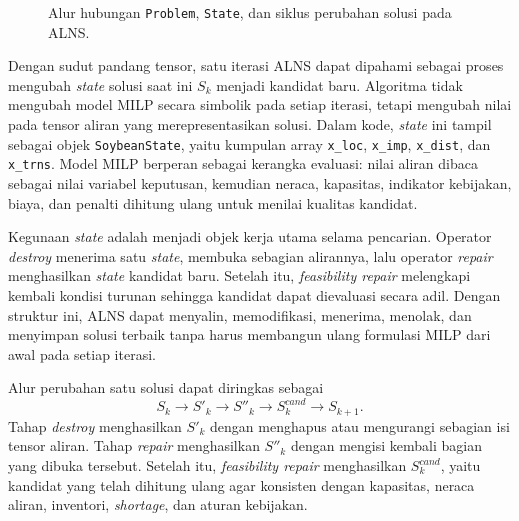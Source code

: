\documentclass{file/TA-ITS}
\theoremstyle{definition}
\theoremstyle{definition}
\theoremstyle{plain}
\begin{document}
\begin{figure}[H]
{
}
\caption{Alur hubungan \texttt{Problem}, \texttt{State}, dan siklus perubahan solusi pada ALNS.}
\label{fig:problem_state_alns_flow}
\end{figure}

Dengan sudut pandang tensor, satu iterasi ALNS dapat dipahami sebagai proses mengubah \textit{state} solusi saat ini \(S_k\) menjadi kandidat baru. Algoritma tidak mengubah model MILP secara simbolik pada setiap iterasi, tetapi mengubah nilai pada tensor aliran yang merepresentasikan solusi. Dalam kode, \textit{state} ini tampil sebagai objek \texttt{SoybeanState}, yaitu kumpulan array \texttt{x\_loc}, \texttt{x\_imp}, \texttt{x\_dist}, dan \texttt{x\_trns}. Model MILP berperan sebagai kerangka evaluasi: nilai aliran dibaca sebagai nilai variabel keputusan, kemudian neraca, kapasitas, indikator kebijakan, biaya, dan penalti dihitung ulang untuk menilai kualitas kandidat.

Kegunaan \textit{state} adalah menjadi objek kerja utama selama pencarian. Operator \textit{destroy} menerima satu \textit{state}, membuka sebagian alirannya, lalu operator \textit{repair} menghasilkan \textit{state} kandidat baru. Setelah itu, \textit{feasibility repair} melengkapi kembali kondisi turunan sehingga kandidat dapat dievaluasi secara adil. Dengan struktur ini, ALNS dapat menyalin, memodifikasi, menerima, menolak, dan menyimpan solusi terbaik tanpa harus membangun ulang formulasi MILP dari awal pada setiap iterasi.

Alur perubahan satu solusi dapat diringkas sebagai
\[
S_k
\rightarrow
S'_k
\rightarrow
S''_k
\rightarrow
S^{cand}_k
\rightarrow
S_{k+1}.
\]
Tahap \textit{destroy} menghasilkan \(S'_k\) dengan menghapus atau mengurangi sebagian isi tensor aliran. Tahap \textit{repair} menghasilkan \(S''_k\) dengan mengisi kembali bagian yang dibuka tersebut. Setelah itu, \textit{feasibility repair} menghasilkan \(S^{cand}_k\), yaitu kandidat yang telah dihitung ulang agar konsisten dengan kapasitas, neraca aliran, inventori, \textit{shortage}, dan aturan kebijakan.
\end{document}

